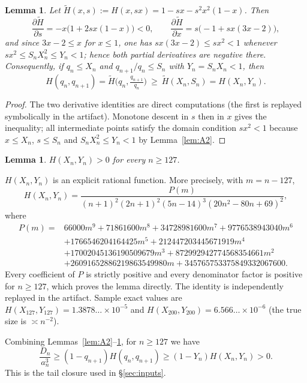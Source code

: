 \documentclass[11pt]{amsart}
\newtheorem{lemma}[theorem]{Lemma}
\theoremstyle{definition}
\theoremstyle{remark}
\begin{document}
\begin{lemma}\label{lem:A4}
Let $\widetilde H(x,s):=H(x,sx)=1-sx-s^{2}x^{2}(1-x)$. Then
\[
\frac{\partial\widetilde H}{\partial s}=-x\bigl(1+2sx(1-x)\bigr)<0,
\qquad
\frac{\partial\widetilde H}{\partial x}=s\bigl(-1+sx(3x-2)\bigr),
\]
and since $3x-2\le x$ for $x\le 1$, one has $sx(3x-2)\le sx^{2}<1$
whenever $sx^{2}\le S_nX_n^{2}\le Y_n<1$; hence both partial
derivatives are negative there. Consequently, if $q_n\le X_n$ and
$q_{n+1}/q_n\le S_n$ with $Y_n=S_nX_n<1$, then
\[
H(q_n,q_{n+1})=\widetilde H\bigl(q_n,\tfrac{q_{n+1}}{q_n}\bigr)
\ \ge\ \widetilde H(X_n,S_n)=H(X_n,Y_n).
\]
\end{lemma}

\begin{proof}
The two derivative identities are direct computations (the first is
replayed symbolically in the artifact). Monotone descent in $s$ then in
$x$ gives the inequality; all intermediate points satisfy the domain
condition $sx^{2}<1$ because $x\le X_n$, $s\le S_n$ and
$S_nX_n^{2}\le Y_n<1$ by Lemma~\ref{lem:A2}.
\end{proof}

\begin{lemma}\label{lem:A5}
$H(X_n,Y_n)>0$ for every $n\ge 127$.
\end{lemma}

$H(X_n,Y_n)$ is an explicit rational function.  More precisely, with
$m=n-127$,
\[
 H(X_n,Y_n)=
 \frac{P(m)}
 {(n+1)^2(2n+1)^2(5n-14)^3(20n^2-80n+69)^2},
\]
where
\begin{align*}
P(m)={}&66000m^9+71861600m^8+34728981600m^7
       +9776538943040m^6\\
 &+1766546204164425m^5+212447203445671919m^4\\
 &+17002045136190509679m^3+872992942774568354661m^2\\
 &+26091652886219863549980m
       +345765753375849332067600.
\end{align*}
Every coefficient of $P$ is strictly positive and every denominator
factor is positive for $n\ge127$, which proves the lemma directly.
The identity is independently replayed in the artifact.  Sample exact
values are $H(X_{127},Y_{127})=1.3878\ldots\times10^{-5}$ and
$H(X_{200},Y_{200})=6.566\ldots\times10^{-6}$ (the true size is
$\asymp n^{-2}$).

Combining Lemmas~\ref{lem:A2}--\ref{lem:A5}, for $n\ge127$ we have
\[
\frac{D_n}{a_n^{3}}
\ge(1-q_{n+1})H(q_n,q_{n+1})
\ge(1-Y_n)H(X_n,Y_n)>0.
\]
This is the tail closure used in \S\ref{sec:inputs}.
\end{document}
